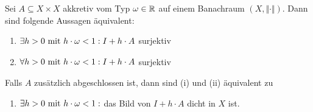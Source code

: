 \begin{theorem}
Sei $A\subseteq X\times X$ akkretiv vom Typ $\omega\in\R$ auf einem Banachraum $(X,\Vert\cdot\Vert)$. Dann sind folgende Aussagen äquivalent:
\begin{enumerate}[label=(\roman*)]
\item $\begin{aligned}
\exists h>0\mit h\cdot\omega<1:I+h\cdot A
\end{aligned}$ surjektiv
\item $\begin{aligned}
\forall h>0\mit h\cdot\omega<1: I+h\cdot A
\end{aligned}$ surjektiv
\end{enumerate}
Falls $A$ zusätzlich abgeschlossen ist, dann sind (i) und (ii) äquivalent zu
\begin{enumerate}[label=(iii)]
\item $\begin{aligned}
\exists h>0\mit h\cdot\omega<1:
\end{aligned}$ das Bild von $I+h\cdot A$ dicht in $X$ ist.
\end{enumerate}
\end{theorem}

